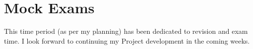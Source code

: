 \section{Mock Exams}

This time period (as per my planning) has been dedicated to revision and exam time. I look forward to continuing my Project development in the coming weeks.
